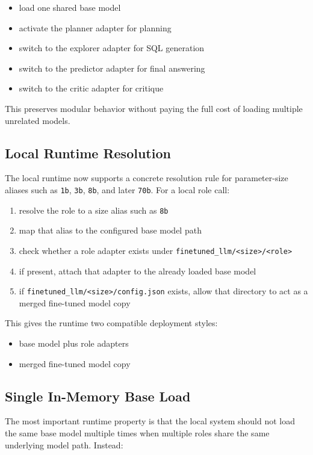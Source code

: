 \documentclass[11pt]{book}
\begin{document}
\begin{itemize}
\item load one shared base model
\item activate the planner adapter for planning
\item switch to the explorer adapter for SQL generation
\item switch to the predictor adapter for final answering
\item switch to the critic adapter for critique
\end{itemize}

This preserves modular behavior without paying the full cost of loading multiple unrelated models.

\subsection*{Local Runtime Resolution}
The local runtime now supports a concrete resolution rule for parameter-size aliases such as
\texttt{1b}, \texttt{3b}, \texttt{8b}, and later \texttt{70b}. For a local role call:

\begin{enumerate}
\item resolve the role to a size alias such as \texttt{8b}
\item map that alias to the configured base model path
\item check whether a role adapter exists under \texttt{finetuned\_llm/<size>/<role>}
\item if present, attach that adapter to the already loaded base model
\item if \texttt{finetuned\_llm/<size>/config.json} exists, allow that directory to act as a merged fine-tuned model copy
\end{enumerate}

This gives the runtime two compatible deployment styles:

\begin{itemize}
\item base model plus role adapters
\item merged fine-tuned model copy
\end{itemize}

\subsection*{Single In-Memory Base Load}
The most important runtime property is that the local system should not load the same base model
multiple times when multiple roles share the same underlying model path. Instead:
\end{document}
